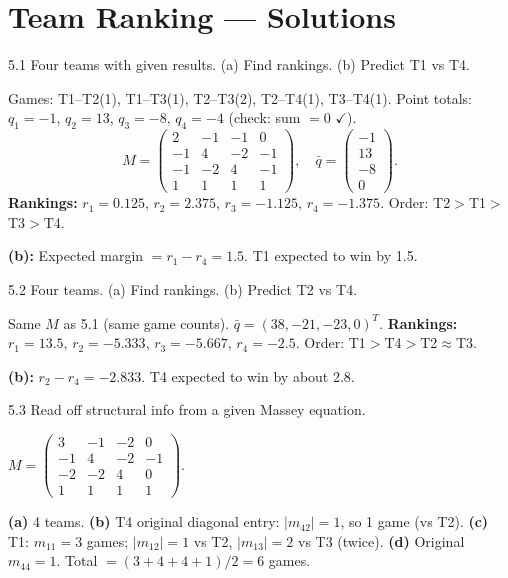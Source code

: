 \chapter{Team Ranking --- Solutions}

\begin{exercise}{5.1}
Four teams with given results. (a) Find rankings. (b) Predict T1 vs T4.
\end{exercise}
\begin{solution}
Games: T1--T2(1), T1--T3(1), T2--T3(2), T2--T4(1), T3--T4(1). Point totals: $q_1=-1$, $q_2=13$, $q_3=-8$, $q_4=-4$ (check: sum $=0$ $\checkmark$).
\[M=\begin{pmatrix}2&-1&-1&0\\-1&4&-2&-1\\-1&-2&4&-1\\1&1&1&1\end{pmatrix},\quad\bar{q}=\begin{pmatrix}-1\\13\\-8\\0\end{pmatrix}.\]
\textbf{Rankings:} $r_1=0.125$, $r_2=2.375$, $r_3=-1.125$, $r_4=-1.375$. Order: T2$>$T1$>$T3$>$T4.

\textbf{(b):} Expected margin $=r_1-r_4=1.5$. T1 expected to win by 1.5.
\end{solution}

\begin{exercise}{5.2}
Four teams. (a) Find rankings. (b) Predict T2 vs T4.
\end{exercise}
\begin{solution}
Same $M$ as 5.1 (same game counts). $\bar{q}=(38,-21,-23,0)^T$.
\textbf{Rankings:} $r_1=13.5$, $r_2=-5.333$, $r_3=-5.667$, $r_4=-2.5$. Order: T1$>$T4$>$T2$\approx$T3.

\textbf{(b):} $r_2-r_4=-2.833$. T4 expected to win by about 2.8.
\end{solution}

\begin{exercise}{5.3}
Read off structural info from a given Massey equation.
\end{exercise}
\begin{solution}
$M=\begin{pmatrix}3&-1&-2&0\\-1&4&-2&-1\\-2&-2&4&0\\1&1&1&1\end{pmatrix}$.

\textbf{(a)} 4 teams. \textbf{(b)} T4 original diagonal entry: $|m_{42}|=1$, so 1 game (vs T2). \textbf{(c)} T1: $m_{11}=3$ games; $|m_{12}|=1$ vs T2, $|m_{13}|=2$ vs T3 (twice). \textbf{(d)} Original $m_{44}=1$. Total $=(3+4+4+1)/2=6$ games.
\end{solution}

